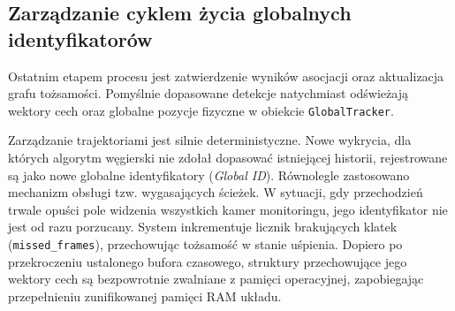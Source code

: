\subsection{Zarządzanie cyklem życia globalnych identyfikatorów}

Ostatnim etapem procesu jest zatwierdzenie wyników asocjacji oraz aktualizacja grafu tożsamości.
Pomyślnie dopasowane detekcje natychmiast odświeżają wektory cech oraz globalne pozycje fizyczne w
obiekcie \texttt{GlobalTracker}.

Zarządzanie trajektoriami jest silnie deterministyczne. Nowe wykrycia, dla których algorytm
węgierski nie zdołał dopasować istniejącej historii, rejestrowane są jako nowe globalne
identyfikatory (\textit{Global ID}). Równolegle zastosowano mechanizm obsługi tzw. wygasających
ścieżek. W sytuacji, gdy przechodzień trwale opuści pole widzenia wszystkich kamer monitoringu,
jego identyfikator nie jest od razu porzucany. System inkrementuje licznik brakujących klatek
(\texttt{missed\_frames}), przechowując tożsamość w stanie uśpienia. Dopiero po przekroczeniu
ustalonego bufora czasowego, struktury przechowujące jego wektory cech są bezpowrotnie zwalniane z
pamięci operacyjnej, zapobiegając przepełnieniu zunifikowanej pamięci RAM układu.

